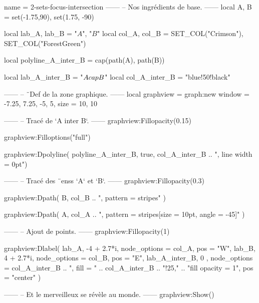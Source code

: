 \documentclass{standalone}
\begin{document}
\begin{luadraw}{name = 2-sets-focus-intersection}
------
-- Nos ingrédients de base.
------
local A, B = set(-1.75,90), set(1.75, -90)

local lab_A, lab_B = "$A$", "$B$"
local col_A, col_B = SET_COL("Crimson"), SET_COL("ForestGreen")

local polyline_A_inter_B = cap(path(A), path(B))

local lab_A_inter_B       = "$A \\cap B$"
local col_A_inter_B       = "blue!50!black"

------
-- ¨Def de la zone graphique.
------
local graphview = graph:new{
  window = {-7.25, 7.25, -5, 5},
  size   = {10, 10}
}

------
-- Tracé de `A inter B`.
------
graphview:Fillopacity(0.15)

graphview:Filloptions("full")

graphview:Dpolyline(
  polyline_A_inter_B,
  true,
  col_A_inter_B .. ", line width = 0pt")

------
-- Tracé des ¨enss `A` et `B`.
------
graphview:Fillopacity(0.3)

graphview:Dpath(
  B,
  col_B .. ", pattern = stripes"
)

graphview:Dpath(
  A,
  col_A .. ", pattern = {stripes[size = 10pt, angle = -45]}"
)


------
-- Ajout de points.
------
graphview:Fillopacity(1)

graphview:Dlabel(
  lab_A, -4 + 2.7*i, {node_options = col_A, pos = "W"},
  lab_B, 4 + 2.7*i, {node_options = col_B, pos = "E"},
  lab_A_inter_B, 0 , {
    node_options = col_A_inter_B
                .. ", fill = " .. col_A_inter_B .. "!25,"
                .. "fill opacity = 1",
    pos = "center"
  }
)

------
-- Et le merveilleux se révèle au monde.
------
graphview:Show()
\end{luadraw}
\end{document}
